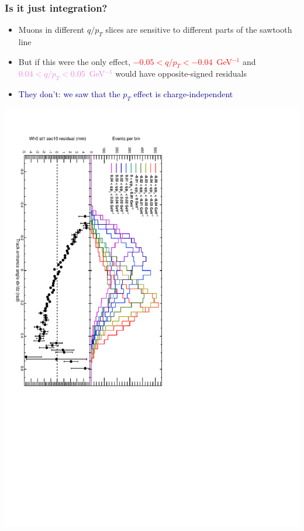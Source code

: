 \documentclass[compress]{beamer}
\begin{document}
\begin{frame}
\frametitle{Is it just integration?}

\begin{itemize}
\item Muons in different $q/p_T$ slices are sensitive to different parts of the sawtooth line
\item But if this were the only effect, \textcolor{red}{$-0.05 < q/p_T
  < -0.04$~GeV$^{-1}$} and \textcolor{violet}{$0.04 < q/p_T <
  0.05$~GeV$^{-1}$} would have opposite-signed residuals
\item \textcolor{darkblue}{They don't: we saw that the $p_T$ effect is charge-independent}
\end{itemize}

\includegraphics[height=\linewidth, angle=90]{sawtooth_and_qoverpt.pdf}
\end{frame}
\end{document}
